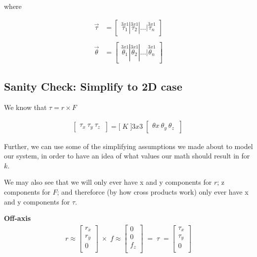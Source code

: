 \documentclass[12pt]{article}
\begin{document}
where

\begin{align}
\vec{\tau} &= \begin{bmatrix} \stackrel{3x1}{\tau_1} | \stackrel{3x1}{\tau_2} | ... |\stackrel{3x1}{\tau_n} \end{bmatrix} \\
\\
\vec{\theta} &= \begin{bmatrix} \stackrel{3x1}{\theta_1} | \stackrel{3x1}{\theta_2} | ... |\stackrel{3x1}{\theta_n} \end{bmatrix}
\end{align}

\subsection{Sanity Check: Simplify to 2D case}

We know that $\tau = r \times F$


\begin{align}
    \begin{bmatrix}
        \tau_{x} \
        \tau_{y} \
        \tau_{z} \
    \end{bmatrix} =
    \Bigg[ \; K \; \Bigg]{3x3} \;
    \begin{bmatrix}
        \theta{x} \
        \theta_{y} \
        \theta_{z} \
    \end{bmatrix} \
\end{align}

Further, we can use some of the simplifying assumptions we made about to model our system, in order to have an idea of what values our math should result in for $k$.

We may also see that we will only ever have x and y components for $r$; z components for $F$; and thereforce (by how cross products work) only ever have x and y components for $\tau$.

\textbf{Off-axis}
\begin{align}
r \approx
\begin{bmatrix}
    r_x       \\
    r_y       \\
    0       \\
\end{bmatrix} \; \times \;
f \approx
\begin{bmatrix}
    0       \\
    0       \\
    f_z      \\
\end{bmatrix} \; =  \; \tau \; = 
\begin{bmatrix}
    \tau_x       \\
    \tau_y       \\
    0      \\
\end{bmatrix}\\
\end{align}
\end{document}
